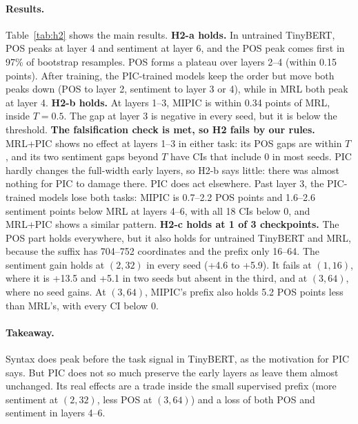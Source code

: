 \paragraph{Results.}
Table~\ref{tab:h2} shows the main results.
\textbf{H2-a holds.}
In untrained TinyBERT, POS peaks at layer 4 and sentiment at layer 6, and the POS peak comes first in 97\% of bootstrap resamples.
POS forms a plateau over layers 2--4 (within 0.15 points).
After training, the PIC-trained models keep the order but move both peaks down (POS to layer 2, sentiment to layer 3 or 4), while in MRL both peak at layer 4.
\textbf{H2-b holds.}
At layers 1--3, MIPIC is within 0.34 points of MRL, inside $T{=}0.5$.
The gap at layer 3 is negative in every seed, but it is below the threshold.
\textbf{The falsification check is met, so H2 fails by our rules.}
MRL+PIC shows no effect at layers 1--3 in either task: its POS gaps are within $T$, and its two sentiment gaps beyond $T$ have CIs that include 0 in most seeds.
PIC hardly changes the full-width early layers, so H2-b says little: there was almost nothing for PIC to damage there.
PIC does act elsewhere.
Past layer 3, the PIC-trained models lose both tasks: MIPIC is 0.7--2.2 POS points and 1.6--2.6 sentiment points below MRL at layers 4--6, with all 18 CIs below 0, and MRL+PIC shows a similar pattern.
\textbf{H2-c holds at 1 of 3 checkpoints.}
The POS part holds everywhere, but it also holds for untrained TinyBERT and MRL, because the suffix has 704--752 coordinates and the prefix only 16--64.
The sentiment gain holds at $(2,32)$ in every seed (+4.6 to +5.9).
It fails at $(1,16)$, where it is +13.5 and +5.1 in two seeds but absent in the third, and at $(3,64)$, where no seed gains.
At $(3,64)$, MIPIC's prefix also holds 5.2 POS points less than MRL's, with every CI below 0.

\paragraph{Takeaway.}
Syntax does peak before the task signal in TinyBERT, as the motivation for PIC says.
But PIC does not so much preserve the early layers as leave them almost unchanged.
Its real effects are a trade inside the small supervised prefix (more sentiment at $(2,32)$, less POS at $(3,64)$) and a loss of both POS and sentiment in layers 4--6.
